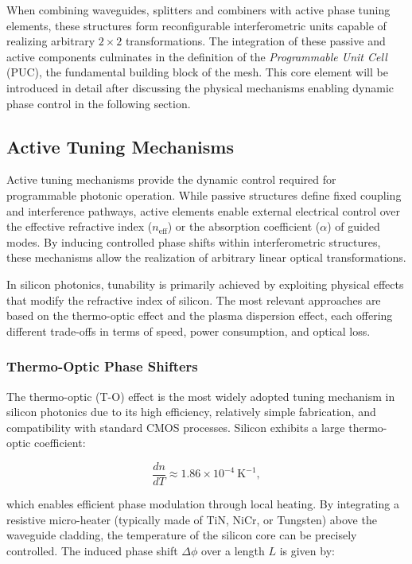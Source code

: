 When combining waveguides, splitters and combiners with active phase tuning elements, these 
structures form reconfigurable interferometric units capable of realizing arbitrary $2 \times 2$ 
transformations. The integration of these passive and active components culminates in the 
definition of the \textit{Programmable Unit Cell} (PUC), the fundamental building block of the 
mesh. This core element will be introduced in detail after discussing the physical mechanisms 
enabling dynamic phase control in the following section.



\subsection{Active Tuning Mechanisms}

Active tuning mechanisms provide the dynamic control required for programmable photonic operation.
 While passive structures define fixed coupling and interference pathways, active elements enable 
 external electrical control over the effective refractive index ($n_{\text{eff}}$) or the 
 absorption coefficient ($\alpha$) of guided modes. By inducing controlled phase shifts within 
 interferometric structures, these mechanisms allow the realization of arbitrary linear optical 
 transformations.

In silicon photonics, tunability is primarily achieved by exploiting physical effects that modify 
the refractive index of silicon. The most relevant approaches are based on the thermo-optic effect 
and the plasma dispersion effect, each offering different trade-offs in terms of speed, power 
consumption, and optical loss.



\subsubsection*{Thermo-Optic Phase Shifters}

The thermo-optic (T-O) effect is the most widely adopted tuning mechanism in silicon photonics due 
to its high efficiency, relatively simple fabrication, and compatibility with standard CMOS 
processes. Silicon exhibits a large thermo-optic coefficient:

\begin{equation}
\frac{dn}{dT} \approx 1.86 \times 10^{-4} \ \text{K}^{-1},
\end{equation}

which enables efficient phase modulation through local heating. By integrating a resistive 
micro-heater (typically made of TiN, NiCr, or Tungsten) above the waveguide cladding, the 
temperature of the silicon core can be precisely controlled. The induced phase shift $\Delta \phi$ 
over a length $L$ is given by:

